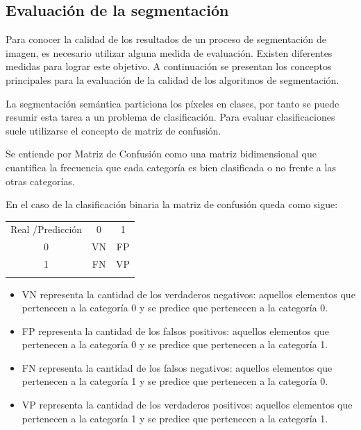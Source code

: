 \subsection{Evaluación de la segmentación}

Para conocer la calidad de los resultados de un proceso de segmentación de imagen, es necesario utilizar alguna medida de evaluación. Existen diferentes medidas para lograr este objetivo. A continuación se presentan los conceptos principales para la evaluación de la calidad de los algoritmos de segmentación.

La segmentación semántica particiona los píxeles en clases, por tanto se puede resumir esta tarea a un problema de clasificación. Para evaluar clasificaciones suele utilizarse el concepto de matriz de confusión.

\begin{definition}
	Se entiende por Matriz de Confusión como una matriz bidimensional que cuantifica la frecuencia que cada categoría es bien clasificada o no frente a las otras categorías.
\end{definition}

En el caso de la clasificación binaria la matriz de confusión queda como sigue:

\begin{table}[h]
	
	\begin{tabular}{|| c || c | c ||}
		\hhline{|=||=|=|}
		
		Real /Predicción & 0 & 1\\ \hhline{||=||=|=||}
		0 & VN & FP\\
		1 & FN & VP \\ \hhline{|=||=|=|}
	\end{tabular}
\end{table}

\begin{itemize}
	\item VN representa la cantidad  de los verdaderos negativos: aquellos elementos que pertenecen a la categoría 0 y se predice que pertenecen a la categoría 0.
	\item FP representa la cantidad  de  los falsos positivos: aquellos elementos que pertenecen a la categoría 0 y se predice que pertenecen a la categoría 1.
	\item FN representa la cantidad  de  los falsos negativos: aquellos elementos que pertenecen a la categoría 1 y se predice que pertenecen a la categoría 0.
	\item VP representa la cantidad  de  los verdaderos positivos: aquellos elementos que pertenecen a la categoría 1 y se predice que pertenecen a la categoría 1.
\end{itemize}

